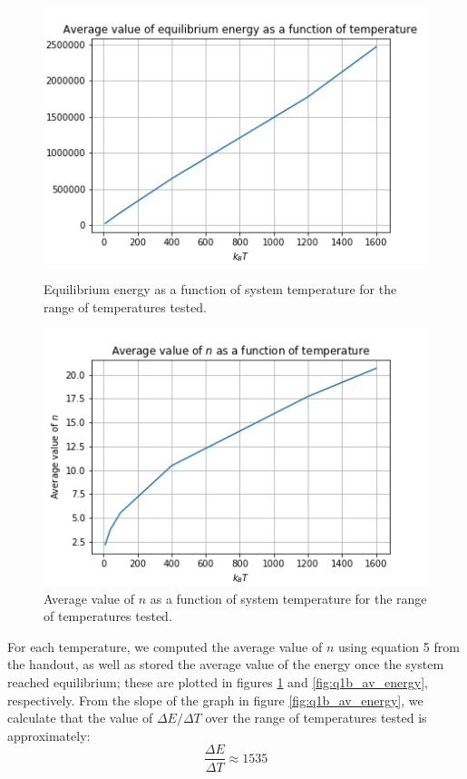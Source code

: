 \documentclass{article}
\begin{document}
\begin{figure}[H]
	\centering
	\begin{minipage}{0.49\linewidth}
		\includegraphics[width=\linewidth]{../images/q1b_av_energy.png}
		\caption{Equilibrium energy as a function of system temperature for the range of temperatures tested.}
		\label{fig:q1b_av_energy}
	\end{minipage}
		\begin{minipage}{0.49\linewidth}
		\includegraphics[width=\linewidth]{../images/q1b_av_n.png}
		\caption{Average value of $n$ as a function of system temperature for the range of temperatures tested.}
		\label{fig:q1b_av_n}
	\end{minipage}
\end{figure}

For each temperature, we computed the average value of $n$ using equation 5 from the handout, as well as stored the average value of the energy once the system reached equilibrium; these are plotted in figures \ref{fig:q1b_av_n} and \ref{fig:q1b_av_energy}, respectively. From the slope of the graph in figure \ref{fig:q1b_av_energy}, we calculate that the value of $\Delta E / \Delta T$ over the range of temperatures tested is approximately:
\begin{equation}
	\frac{\Delta E}{\Delta T} \approx 1535
\end{equation}
\end{document}
